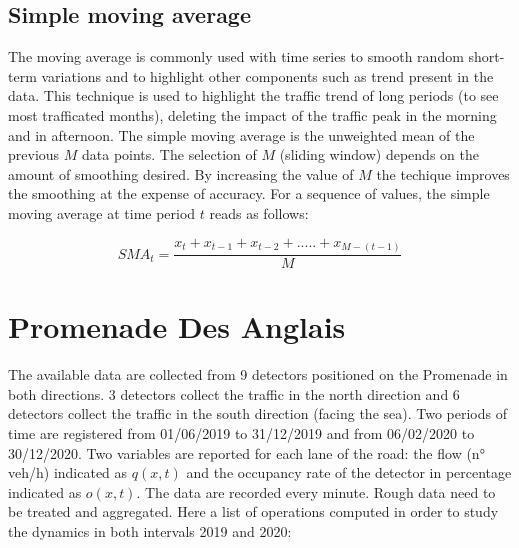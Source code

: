 \documentclass[11pt]{article}
\begin{document}
    \subsection{Simple moving average}

    The moving average is commonly used with time series to smooth random
short-term variations and to highlight other components such as trend
present in the data. This technique is used to highlight the traffic
trend of long periods (to see most trafficated months), deleting the
impact of the traffic peak in the morning and in afternoon. The simple
moving average is the unweighted mean of the previous \(M\) data points.
The selection of \(M\) (sliding window) depends on the amount of
smoothing desired. By increasing the value of \(M\) the techique
improves the smoothing at the expense of accuracy. For a sequence of
values, the simple moving average at time period \(t\) reads as follows:

\begin{equation}
\label{eq:13}
 SMA_t=\frac{x_t+x_{t-1}+x_{t-2}+.....+x_{M-(t-1)}}{M}
\end{equation}

    \section{Promenade Des Anglais}

    The available data are collected from 9 detectors positioned on the
Promenade in both directions. 3 detectors collect the traffic in the
north direction and 6 detectors collect the traffic in the south
direction (facing the sea). Two periods of time are registered from
01/06/2019 to 31/12/2019 and from 06/02/2020 to 30/12/2020. Two
variables are reported for each lane of the road: the flow (n° veh/h)
indicated as \(q(x,t)\) and the occupancy rate of the detector in
percentage indicated as \(o(x,t)\). The data are recorded every minute.
Rough data need to be treated and aggregated. Here a list of operations
computed in order to study the dynamics in both intervals 2019 and 2020:
\end{document}

